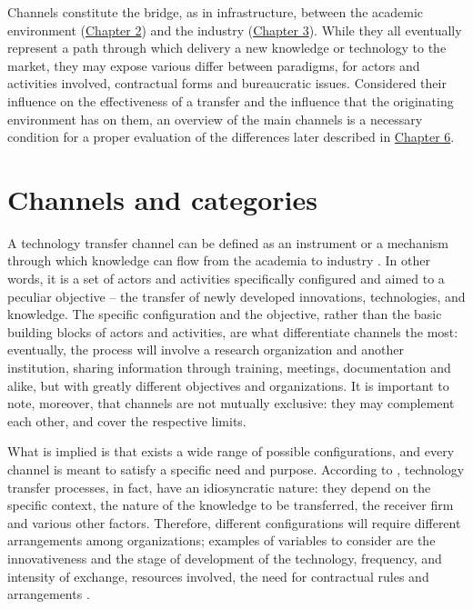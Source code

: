 

\label{Chapter4} %

Channels constitute the bridge, as in infrastructure, between the academic environment (\hyperref[Chapter2]{Chapter 2}) and the industry (\hyperref[Chapter3]{Chapter 3}). While they all eventually represent a path through which delivery a new knowledge or technology to the market, they may expose various differ between paradigms, for actors and activities involved, contractual forms and bureaucratic issues. Considered their influence on the effectiveness of a transfer and the influence that the originating environment has on them, an overview of the main channels is a necessary condition for a proper evaluation of the differences later described in \hyperref[Chapter6]{Chapter 6}.  

\section{Channels and categories}

A technology transfer channel can be defined as an instrument or a mechanism through which knowledge can flow from the academia to industry \citep{Gilsing2011}. In other words, it is a set of actors and activities specifically configured and aimed to a peculiar objective – the transfer of newly developed innovations, technologies, and knowledge. The specific configuration and the objective, rather than the basic building blocks of actors and activities, are what differentiate channels the most: eventually, the process will involve a research organization and another institution, sharing information through training, meetings, documentation and alike, but with greatly different objectives and organizations. It is important to note, moreover, that channels are not mutually exclusive: they may complement each other, and cover the respective limits.

What is implied is that exists a wide range of possible configurations, and every channel is meant to satisfy a specific need and purpose. According to \citet{DEste2007}, technology transfer processes, in fact, have an idiosyncratic nature: they depend on the specific context, the nature of the knowledge to be transferred, the receiver firm and various other factors. Therefore, different configurations will require different arrangements among organizations; examples of variables to consider are the innovativeness and the stage of development of the technology, frequency, and intensity of exchange, resources involved, the need for contractual rules and arrangements \citep{DEste2007}.

